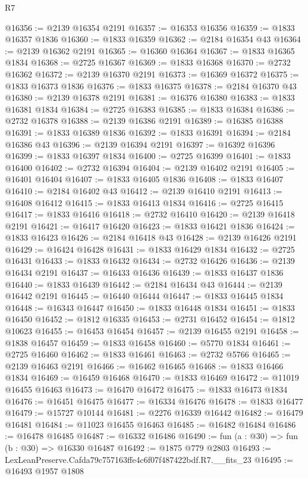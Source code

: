 \begin{lexlean}{R7}
\begin{coremodule}
@16356 := @2139 @16354 @2191
@16357 := @16353 @16356
@16359 := @1833 @16357 @1836
@16360 := @1833 @16359
@16362 := @2184 @16354 @43
@16364 := @2139 @16362 @2191
@16365 := @16360 @16364
@16367 := @1833 @16365 @1834
@16368 := @2725 @16367
@16369 := @1833 @16368
@16370 := @2732 @16362
@16372 := @2139 @16370 @2191
@16373 := @16369 @16372
@16375 := @1833 @16373 @1836
@16376 := @1833 @16375
@16378 := @2184 @16370 @43
@16380 := @2139 @16378 @2191
@16381 := @16376 @16380
@16383 := @1833 @16381 @1834
@16384 := @2725 @16383
@16385 := @1833 @16384
@16386 := @2732 @16378
@16388 := @2139 @16386 @2191
@16389 := @16385 @16388
@16391 := @1833 @16389 @1836
@16392 := @1833 @16391
@16394 := @2184 @16386 @43
@16396 := @2139 @16394 @2191
@16397 := @16392 @16396
@16399 := @1833 @16397 @1834
@16400 := @2725 @16399
@16401 := @1833 @16400
@16402 := @2732 @16394
@16404 := @2139 @16402 @2191
@16405 := @16401 @16404
@16407 := @1833 @16405 @1836
@16408 := @1833 @16407
@16410 := @2184 @16402 @43
@16412 := @2139 @16410 @2191
@16413 := @16408 @16412
@16415 := @1833 @16413 @1834
@16416 := @2725 @16415
@16417 := @1833 @16416
@16418 := @2732 @16410
@16420 := @2139 @16418 @2191
@16421 := @16417 @16420
@16423 := @1833 @16421 @1836
@16424 := @1833 @16423
@16426 := @2184 @16418 @43
@16428 := @2139 @16426 @2191
@16429 := @16424 @16428
@16431 := @1833 @16429 @1834
@16432 := @2725 @16431
@16433 := @1833 @16432
@16434 := @2732 @16426
@16436 := @2139 @16434 @2191
@16437 := @16433 @16436
@16439 := @1833 @16437 @1836
@16440 := @1833 @16439
@16442 := @2184 @16434 @43
@16444 := @2139 @16442 @2191
@16445 := @16440 @16444
@16447 := @1833 @16445 @1834
@16448 := @16343 @16447
@16450 := @1833 @16448 @1834
@16451 := @1833 @16450
@16452 := @1812 @16335
@16453 := @2731 @16452
@16454 := @1812 @10623
@16455 := @16453 @16454
@16457 := @2139 @16455 @2191
@16458 := @1838 @16457
@16459 := @1833 @16458
@16460 := @5770 @1834
@16461 := @2725 @16460
@16462 := @1833 @16461
@16463 := @2732 @5766
@16465 := @2139 @16463 @2191
@16466 := @16462 @16465
@16468 := @1833 @16466 @1834
@16469 := @16459 @16468
@16470 := @1833 @16469
@16472 := @11019 @16455 @16463
@16473 := @16470 @16472
@16475 := @1833 @16473 @1834
@16476 := @16451 @16475
@16477 := @16334 @16476
@16478 := @1833 @16477
@16479 := @15727 @10144
@16481 := @2276 @16339 @16442
@16482 := @16479 @16481
@16484 := @11023 @16455 @16463
@16485 := @16482 @16484
@16486 := @16478 @16485
@16487 := @16332 @16486
@16490 := fun (a : @30) => fun (b : @30) => @16330 @16487
@16492 := @1875 @779 @2803
@16493 := LexLeanPreserve.Cafda79c757163ffe4c6f07f487422bdf.R7.__fits_23
@16495 := @16493 @1957 @1808

\end{coremodule}
\end{lexlean}
